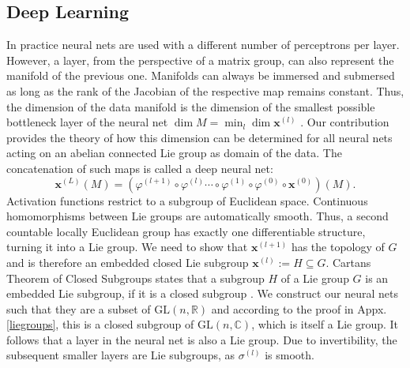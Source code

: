 \documentclass[envcountsect,runningheads]{llncs}
\begin{document}
\subsection{Deep Learning}

In practice neural nets are used with a different number of perceptrons per layer. However, a layer, from the perspective of a matrix group, can also represent the manifold of the previous one. Manifolds can always be immersed and submersed as long as the rank of the Jacobian of the respective map remains constant. Thus, the dimension of the data manifold is the dimension of the smallest possible bottleneck layer of the neural net  $\dim M = \min_l \dim \textbf{x}^{(l)}$ . Our contribution provides the theory of how this dimension can be determined for all neural nets acting on an abelian connected Lie group as domain of the data. The concatenation of such maps is called a deep neural net:
\begin{equation}
    \textbf{x}^{(L)}(M) = \left(\varphi^{(l+1)} \circ \varphi^{(l)} \cdots \circ \varphi^{(1)} \circ \varphi^{(0)} \circ \textbf{x}^{(0)}\right)(M).
\end{equation}
Activation functions restrict to a subgroup of Euclidean space. Continuous homomorphisms between Lie groups are automatically smooth. Thus, a second countable locally Euclidean group has exactly one differentiable structure, turning it into a Lie group. We need to show that $\textbf{x}^{(l+1)}$ has the topology of $G$ and is therefore an embedded closed Lie subgroup $\textbf{x}^{(l)} := H \subseteq G$. Cartans Theorem of Closed Subgroups states that a subgroup $H$ of a Lie group $G$ is an embedded Lie subgroup, if it is a closed subgroup . We construct our neural nets such that they are a subset of $\text{GL}(n,\mathbb{R})$ and according to the proof in Appx. \ref{liegroups}, this is a closed subgroup of $\text{GL}(n,\mathbb{C})$, which is itself a Lie group. It follows that a layer in the neural net is also a Lie group. Due to invertibility, the subsequent smaller layers are Lie subgroups, as $\sigma^{(l)}$ is smooth.
\end{document}
